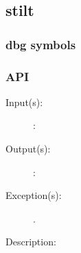 %
%
%
%
%              

\subsection{stilt}
\label{stilt}

\subsubsection{dbg symbols}

\subsubsection{API}
\begin{description}
\label{stilt_}
\item[{\cfunc[]{stilt\_}{}}: ]
	\begin{description}\item[]
	\item[Input(s): ]
		\begin{description}\item[]
		\item[: ]
		\end{description}
	\item[Output(s): ]
		\begin{description}\item[]
		\item[: ]
		\end{description}
	\item[Exception(s): ]
		\begin{description}\item[]
		\item[.]
		\end{description}
	\item[Description: ]
	\end{description}
\end{description}
